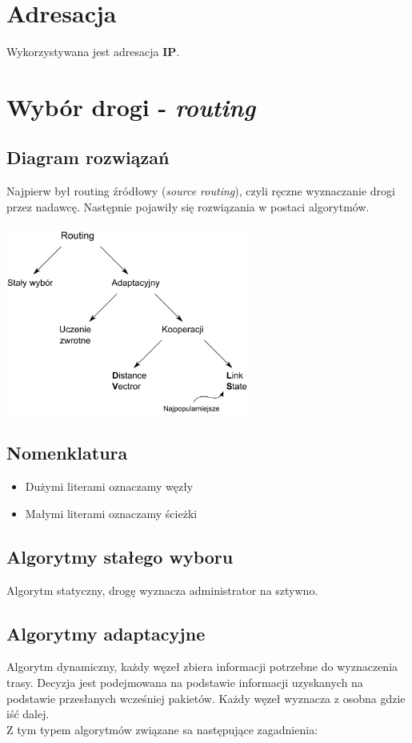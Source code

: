 	\section{Adresacja}
		Wykorzystywana jest adresacja \textbf{IP}.
	\section{Wybór drogi - \emph{routing}}
		\subsection{Diagram rozwiązań}
			Najpierw był routing źródłowy (\emph{source routing}), czyli ręczne wyznaczanie drogi przez nadawcę. Następnie pojawiły się rozwiązania w postaci algorytmów.\\\\
			\includegraphics[width=8cm]{./images/image35.pdf}
		\subsection{Nomenklatura}
			\begin{itemize}
				\item Dużymi literami oznaczamy węzły
				\item Małymi literami oznaczamy ścieżki
			\end{itemize}
		\subsection{Algorytmy stałego wyboru}
			Algorytm statyczny, drogę wyznacza administrator na sztywno.
		\subsection{Algorytmy adaptacyjne}
			Algorytm dynamiczny, każdy węzeł zbiera informacji potrzebne do wyznaczenia trasy. Decyzja jest podejmowana na podstawie informacji uzyskanych na podstawie przesłanych wcześniej pakietów. Każdy węzeł wyznacza z osobna gdzie iść dalej.\\
			Z tym typem algorytmów związane sa następujące zagadnienia:
